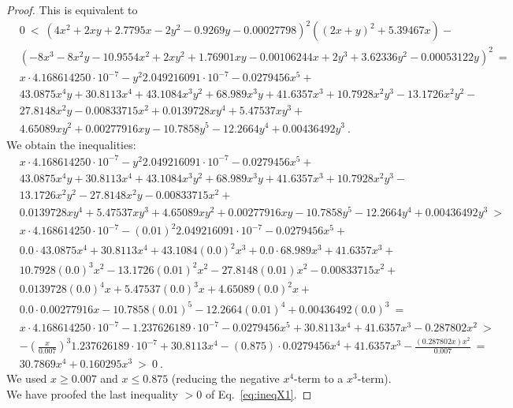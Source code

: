 \documentclass{article}
\renewcommand{\leq}{\leqslant}
\renewcommand{\geq}{\geqslant}
\begin{document}
\begin{proof}
This is equivalent to
\begin{align}
& 0\ < \ \left(4 x^2+2 x y+2.7795 x-2 y^2-0.9269 y-0.00027798\right)^2 \left((2 x+y)^2+5.39467 x\right)-\\ \nonumber &\left(-8 x^3-8 x^2 y-10.9554 x^2+2 x y^2+1.76901 x y-0.00106244 x+2 y^3+3.62336 y^2-0.00053122 y\right)^2\ = \\ 
\nonumber &x \cdot 4.168614250 \cdot 10^{-7}-y^2 2.049216091 \cdot 10^{-7}-0.0279456 x^5+\\ \nonumber &43.0875 x^4 y+30.8113 x^4+43.1084 x^3 y^2+68.989 x^3 y+41.6357 x^3+10.7928 x^2 y^3-13.1726 x^2 y^2-\\ \nonumber &27.8148 x^2 y-0.00833715 x^2+0.0139728 x y^4+5.47537 x y^3+\\ \nonumber &4.65089 x y^2+0.00277916 x y-10.7858 y^5-12.2664 y^4+0.00436492 y^3\ .
\end{align}
We obtain the inequalities: 
\begin{align}
&x \cdot 4.168614250 \cdot 10^{-7}-y^2 2.049216091 \cdot 10^{-7}-0.0279456 x^5+\\ \nonumber &43.0875 x^4 y+30.8113 x^4+43.1084 x^3 y^2+68.989 x^3 y+41.6357 x^3+10.7928 x^2 y^3-\\ \nonumber &13.1726 x^2 y^2-27.8148 x^2 y-0.00833715 x^2+\\ \nonumber &0.0139728 x y^4+5.47537 x y^3+4.65089 x y^2+0.00277916 x y-10.7858 y^5-12.2664 y^4+0.00436492 y^3\ > \\ \nonumber & 
x \cdot 4.168614250 \cdot 10^{-7}-(0.01)^2 2.049216091 \cdot 10^{-7}-0.0279456 x^5+\\ \nonumber &0.0 \cdot  43.0875 x^4+30.8113 x^4+43.1084 (0.0)^2 x^3+0.0 \cdot 68.989 x^3+41.6357 x^3+\\ \nonumber &10.7928 (0.0)^3 x^2-13.1726 (0.01)^2 x^2-27.8148 (0.01) x^2-0.00833715 x^2+\\ \nonumber &0.0139728 (0.0)^4 x+5.47537 (0.0)^3 x+4.65089 (0.0)^2 x+\\ \nonumber &0.0 \cdot 0.00277916 x-10.7858 (0.01)^5-12.2664 (0.01)^4+0.00436492 (0.0)^3\ = \\ \nonumber &x \cdot 4.168614250 \cdot 10^{-7}-1.237626189 \cdot 10^{-7}-0.0279456 x^5+30.8113 x^4+41.6357 x^3-0.287802 x^2\ > \\ \nonumber &-\left(\frac{x}{0.007}\right)^3 1.237626189 \cdot 10^{-7}+30.8113 x^4-(0.875) \cdot 0.0279456 x^4+41.6357 x^3-\frac{(0.287802 x) x^2}{0.007}\ = \\ \nonumber &30.7869 x^4+0.160295 x^3\ >\ 0\ .
\end{align}
We used $x \geq 0.007$ and $x \leq 0.875$ (reducing the negative $x^4$-term to a
$x^3$-term).
We have proofed the last inequality $>0$ of Eq.~\eqref{eq:ineqX1}.


\end{proof}
\end{document}
